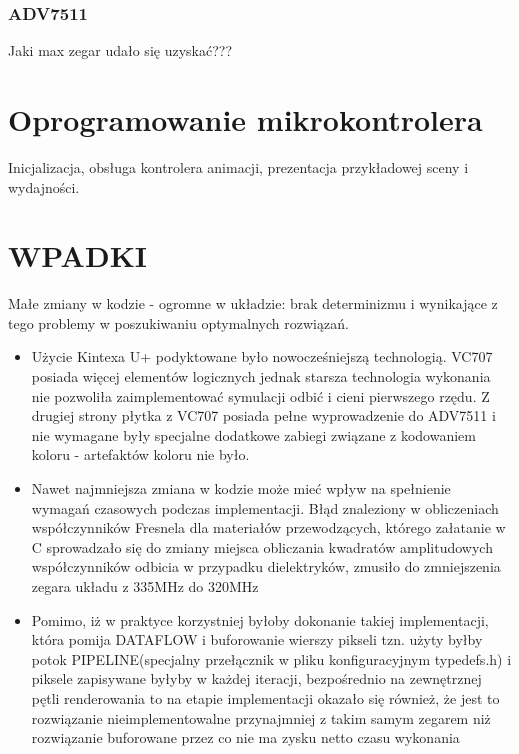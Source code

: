 \subsubsection{ADV7511}
Jaki max zegar udało się uzyskać???

\section{Oprogramowanie mikrokontrolera}
Inicjalizacja, obsługa kontrolera animacji, prezentacja przykładowej sceny i wydajności.
\section{WPADKI}
Małe zmiany w kodzie - ogromne w układzie: brak determinizmu i wynikające z tego problemy w poszukiwaniu optymalnych rozwiązań.
\begin{itemize}
\item Użycie Kintexa U+ podyktowane było nowocześniejszą technologią. VC707 posiada więcej elementów logicznych jednak starsza technologia wykonania nie pozwoliła zaimplementować symulacji odbić i cieni pierwszego rzędu. Z drugiej strony płytka z VC707 posiada pełne wyprowadzenie do ADV7511 i nie wymagane były specjalne dodatkowe zabiegi związane z kodowaniem koloru - artefaktów koloru nie było.
\item Nawet najmniejsza zmiana w kodzie może mieć wpływ na spełnienie wymagań czasowych podczas implementacji. Błąd znaleziony w obliczeniach współczynników Fresnela dla materiałów przewodzących, którego załatanie w C sprowadzało się do zmiany miejsca obliczania kwadratów amplitudowych współczynników odbicia w przypadku dielektryków, zmusiło do zmniejszenia zegara układu z 335MHz do 320MHz
\item Pomimo, iż w praktyce korzystniej byłoby dokonanie takiej implementacji, która pomija DATAFLOW i buforowanie wierszy pikseli tzn. użyty byłby potok PIPELINE(specjalny przełącznik w pliku konfiguracyjnym typedefs.h) i piksele zapisywane byłyby w każdej iteracji, bezpośrednio na zewnętrznej pętli renderowania to na etapie implementacji okazało się również, że jest to rozwiązanie nieimplementowalne przynajmniej z takim samym zegarem niż rozwiązanie buforowane przez co nie ma zysku netto czasu wykonania

\end{itemize}
